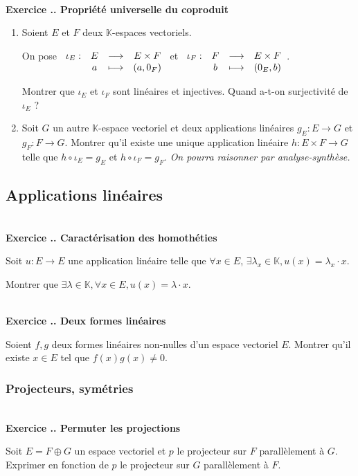 \documentclass{article}
\newcommand{\fonction}[5]{\raisebox{-0.5\baselineskip}{$\begin{array}{lccc}
    #1: & #2 & \longrightarrow & #3 \\
        & #4 & \longmapsto & #5 \end{array}$}}
\newcommand{\mb}[1]{\mathbb{#1}}
\newcounter{exo}
\newcommand{\exercice}[1][\null]{\textbf{\\ Exercice \thesection.\theexo. #1} \addtocounter{exo}{1}}
\begin{document}
\exercice[Propriété universelle du coproduit]

\begin{enumerate}

\item Soient $E$ et $F$ deux $\mb{K}$-espaces vectoriels.

On pose $\fonction{\iota_E}{E}{E\times F}{a}{(a, 0_F)}$ et $\fonction{\iota_F}{F}{E\times F}{b}{(0_E, b)}$.

Montrer que $\iota_E$ et $\iota_F$ sont linéaires et injectives. Quand a-t-on surjectivité de $\iota_E$ ?

\item Soit $G$ un autre $\mb{K}$-espace vectoriel et deux applications linéaires $g_E : E \rightarrow G$ et $g_F : F \rightarrow G$. Montrer qu'il existe une unique application linéaire $h : E \times F \rightarrow G$ telle que $h \circ \iota_E = g_E$ et $h \circ \iota_F= g_F$.  \emph{On pourra raisonner par analyse-synthèse.}

\end{enumerate}



\subsection{Applications linéaires}


\exercice[Caractérisation des homothéties]

Soit $u : E \rightarrow E$ une application linéaire telle que $\forall x \in E$, $\exists \lambda_x \in \mb{K}, u(x) = \lambda_x \cdot x$.

Montrer que $\exists \lambda \in \mb{K}, \forall x \in E, u(x) = \lambda \cdot x$.




\exercice[Deux formes linéaires]

Soient $f,g$ deux formes linéaires non-nulles d'un espace vectoriel $E$. Montrer qu'il existe $x \in E$ tel que $f(x)g(x) \neq 0$.


\subsubsection{Projecteurs, symétries}




\exercice[Permuter les projections]

Soit $E = F \oplus G$ un espace vectoriel et $p$ le projecteur sur $F$ parallèlement à $G$. Exprimer en fonction de $p$ le projecteur sur $G$ parallèlement à $F$.
\end{document}
